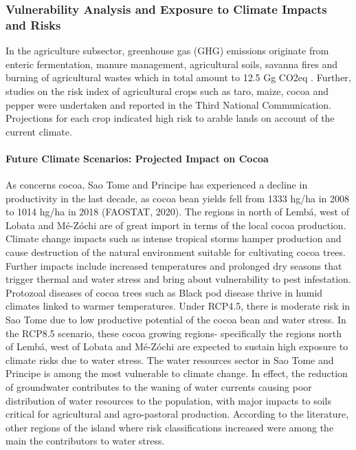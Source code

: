 \documentclass[
]{book}
\begin{document}
\hypertarget{vulnerability-analysis-and-exposure-to-climate-impacts-and-risks}{%
\subsubsection{Vulnerability Analysis and Exposure to Climate Impacts and Risks}\label{vulnerability-analysis-and-exposure-to-climate-impacts-and-risks}}

In the agriculture subsector, greenhouse gas (GHG) emissions originate from enteric fermentation, manure management, agricultural soils, savanna fires and burning of agricultural wastes which in total amount to 12.5 Gg CO2eq . Further, studies on the risk index of agricultural crops such as taro, maize, cocoa and pepper were undertaken and reported in the Third National Communication. Projections for each crop indicated high risk to arable lands on account of the current climate.

\hypertarget{future-climate-scenarios-projected-impact-on-cocoa}{%
\paragraph{Future Climate Scenarios: Projected Impact on Cocoa}\label{future-climate-scenarios-projected-impact-on-cocoa}}

As concerns cocoa, Sao Tome and Principe has experienced a decline in productivity in the last decade, as cocoa bean yields fell from 1333 hg/ha in 2008 to 1014 hg/ha in 2018 (FAOSTAT, 2020). The regions in north of Lembá, west of Lobata and Mé-Zóchi are of great import in terms of the local cocoa production. Climate change impacts such as intense tropical storms hamper production and cause destruction of the natural environment suitable for cultivating cocoa trees. Further impacts include increased temperatures and prolonged dry seasons that trigger thermal and water stress and bring about vulnerability to pest infestation. Protozoal diseases of cocoa trees such as Black pod disease thrive in humid climates linked to warmer temperatures. Under RCP4.5, there is moderate risk in Sao Tome due to low productive potential of the cocoa bean and water stress. In the RCP8.5 scenario, these cocoa growing regions- specifically the regions north of Lembá, west of Lobata and Mé-Zóchi are expected to sustain high exposure to climate risks due to water stress. The water resources sector in Sao Tome and Principe is among the most vulnerable to climate change. In effect, the reduction of groundwater contributes to the waning of water currents causing poor distribution of water resources to the population, with major impacts to soils critical for agricultural and agro-pastoral production. According to the literature, other regions of the island where risk classifications increased were among the main the contributors to water stress.
\end{document}
